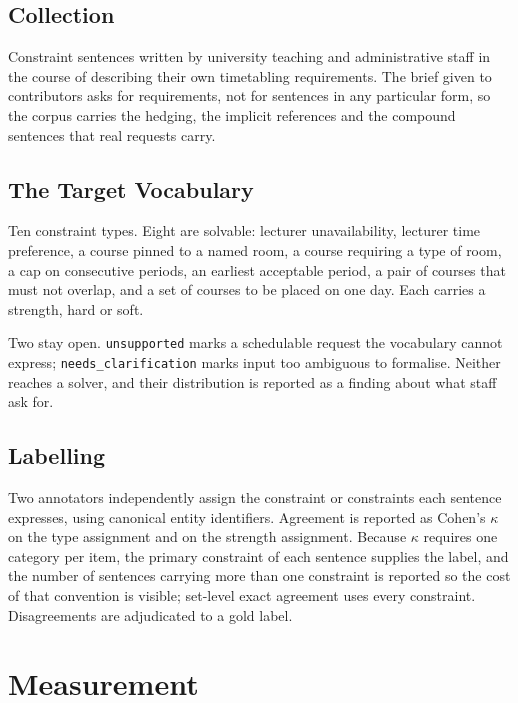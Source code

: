\documentclass[sigconf,screen,review,anonymous]{acmart}
\begin{document}
\subsection{Collection}

Constraint sentences written by university teaching and administrative staff
in the course of describing their own timetabling requirements. The brief
given to contributors asks for requirements, not for sentences in any
particular form, so the corpus carries the hedging, the implicit references
and the compound sentences that real requests carry.

\subsection{The Target Vocabulary}

Ten constraint types. Eight are solvable: lecturer unavailability, lecturer
time preference, a course pinned to a named room, a course requiring a type of
room, a cap on consecutive periods, an earliest acceptable period, a pair of
courses that must not overlap, and a set of courses to be placed on one day.
Each carries a strength, hard or soft.

Two stay open. \texttt{unsupported} marks a schedulable request the vocabulary
cannot express; \texttt{needs\_clarification} marks input too ambiguous to
formalise. Neither reaches a solver, and their distribution is reported as a
finding about what staff ask for.

\subsection{Labelling}

Two annotators independently assign the constraint or constraints each
sentence expresses, using canonical entity identifiers. Agreement is reported
as Cohen's $\kappa$~\cite{cohen1960kappa} on the type assignment and on the
strength assignment. Because $\kappa$ requires one category per item, the
primary constraint of each sentence supplies the label, and the number of
sentences carrying more than one constraint is reported so the cost of that
convention is visible; set-level exact agreement uses every constraint.
Disagreements are adjudicated to a gold label.

\section{Measurement}
\end{document}
